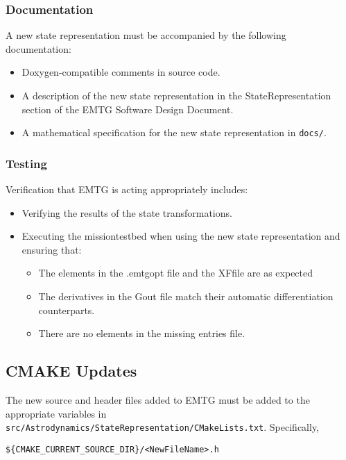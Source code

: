 \documentclass[11pt]{article}
\begin{document}
\subsubsection{Documentation}
\label{subsubsec:emtgDocumentation}

A new state representation must be accompanied by the following documentation:

\begin{itemize}
	\item Doxygen-compatible comments in source code.
	\item A description of the new state representation in the StateRepresentation section of the \ac{EMTG} Software Design Document.
	\item A mathematical specification for the new state representation in \texttt{docs/}.
\end{itemize}

\subsubsection{Testing}
\label{subsubsec:emtgTesting}

Verification that EMTG is acting appropriately includes:

\begin{itemize}
	\item Verifying the results of the state transformations.
	\item Executing the missiontestbed when using the new state representation and ensuring that:
	\begin{itemize}
		\item The elements in the .emtgopt file and the XFfile are as expected
		\item The derivatives in the Gout file match their automatic differentiation counterparts.
		\item There are no elements in the missing entries file.
	\end{itemize}
\end{itemize}

\subsection{CMAKE Updates}
\label{subsec:cmakeUpdates}

The new source and header files added to \ac{EMTG} must be added to the appropriate variables in \texttt{src/Astrodynamics/StateRepresentation/CMakeLists.txt}. Specifically, 

\begin{verbatim}
${CMAKE_CURRENT_SOURCE_DIR}/<NewFileName>.h
\end{verbatim}
\end{document}
